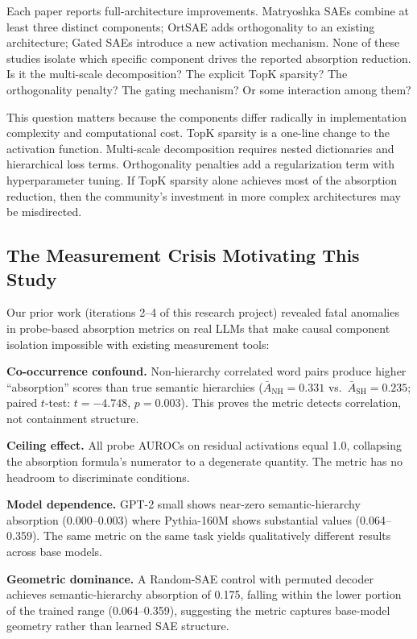 \documentclass{article}
\begin{document}
Each paper reports full-architecture improvements. Matryoshka SAEs combine at least three distinct components; OrtSAE adds orthogonality to an existing architecture; Gated SAEs introduce a new activation mechanism. None of these studies isolate which specific component drives the reported absorption reduction. Is it the multi-scale decomposition? The explicit TopK sparsity? The orthogonality penalty? The gating mechanism? Or some interaction among them?

This question matters because the components differ radically in implementation complexity and computational cost. TopK sparsity is a one-line change to the activation function. Multi-scale decomposition requires nested dictionaries and hierarchical loss terms. Orthogonality penalties add a regularization term with hyperparameter tuning. If TopK sparsity alone achieves most of the absorption reduction, then the community's investment in more complex architectures may be misdirected.

\subsection{The Measurement Crisis Motivating This Study}

Our prior work (iterations 2--4 of this research project) revealed fatal anomalies in probe-based absorption metrics on real LLMs that make causal component isolation impossible with existing measurement tools:

\textbf{Co-occurrence confound.} Non-hierarchy correlated word pairs produce higher ``absorption'' scores than true semantic hierarchies ($\bar{A}_{\text{NH}} = 0.331$ vs.~$\bar{A}_{\text{SH}} = 0.235$; paired $t$-test: $t = -4.748$, $p = 0.003$). This proves the metric detects correlation, not containment structure.

\textbf{Ceiling effect.} All probe AUROCs on residual activations equal 1.0, collapsing the absorption formula's numerator to a degenerate quantity. The metric has no headroom to discriminate conditions.

\textbf{Model dependence.} GPT-2 small shows near-zero semantic-hierarchy absorption (0.000--0.003) where Pythia-160M shows substantial values (0.064--0.359). The same metric on the same task yields qualitatively different results across base models.

\textbf{Geometric dominance.} A Random-SAE control with permuted decoder achieves semantic-hierarchy absorption of 0.175, falling within the lower portion of the trained range (0.064--0.359), suggesting the metric captures base-model geometry rather than learned SAE structure.
\end{document}
